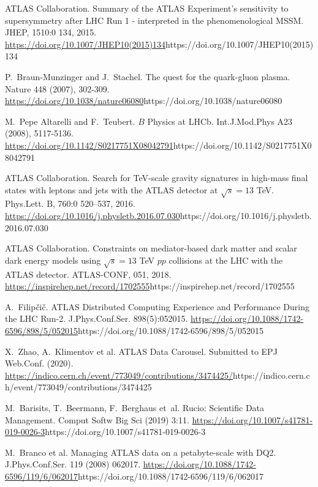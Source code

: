 \documentclass[11pt]{article}
\begin{document}
\begin{thebibliography}{99}
\begin{small}
ATLAS Collaboration.
\newblock Summary of the ATLAS Experiment's sensitivity to supersymmetry after LHC Run 1 - interpreted in the phenomenological MSSM.
\newblock JHEP, 1510:0 134, 2015.
\newblock \url{https://doi.org/10.1007/JHEP10(2015)134}{https://doi.org/10.1007/JHEP10(2015)134}

P.~Braun-Munzinger and J.~Stachel.
\newblock The quest for the quark-gluon plasma.
\newblock Nature 448 (2007), 302-309.
\newblock \url{https://doi.org/10.1038/nature06080}{https://doi.org/10.1038/nature06080}

M.~Pepe Altarelli and F.~Teubert.
\newblock $B$ Physics at LHCb.
\newblock Int.J.Mod.Phys A23 (2008), 5117-5136.
\newblock \url{https://doi.org/10.1142/S0217751X08042791}{https://doi.org/10.1142/S0217751X08042791}

ATLAS Collaboration.
\newblock Search for TeV-scale gravity signatures in high-mass final states with leptons and jets with the ATLAS detector at $\sqrt{s}=13$ TeV.
\newblock Phys.Lett. B, 760:0 520--537, 2016.
\newblock \url{https://doi.org/10.1016/j.physletb.2016.07.030}{https://doi.org/10.1016/j.physletb.2016.07.030}

ATLAS Collaboration.
\newblock Constraints on mediator-based dark matter and scalar dark energy models using $\sqrt{s} = 13$ TeV $pp$ collisions at the LHC with the ATLAS detector.
\newblock ATLAS-CONF, 051, 2018.
\newblock \url{https://inspirehep.net/record/1702555}{https://inspirehep.net/record/1702555}

A.~Filipčič.
\newblock ATLAS Distributed Computing Experience and Performance During the LHC Run-2.
\newblock J.Phys.Conf.Ser. 898(5):052015.
\newblock \url{https://doi.org/10.1088/1742-6596/898/5/052015}{https://doi.org/10.1088/1742-6596/898/5/052015}

X.~Zhao, A.~Klimentov et al.
\newblock ATLAS Data Carousel.
\newblock Submitted to EPJ Web.Conf. (2020).
\newblock \url{https://indico.cern.ch/event/773049/contributions/3474425/}{https://indico.cern.ch/event/773049/contributions/3474425}

M.~Barisits, T.~Beermann, F.~Berghaus et~al.
\newblock Rucio: Scientific Data Management.
\newblock Comput Softw Big Sci (2019) 3:11.
\newblock \url{https://doi.org/10.1007/s41781-019-0026-3}{https://doi.org/10.1007/s41781-019-0026-3}

M.~Branco et al.
\newblock Managing ATLAS data on a petabyte-scale with DQ2.
\newblock J.Phys.Conf.Ser. 119 (2008) 062017.
\newblock \url{https://doi.org/10.1088/1742-6596/119/6/062017}{https://doi.org/10.1088/1742-6596/119/6/062017}


\end{small}
\end{thebibliography}
\end{document}

